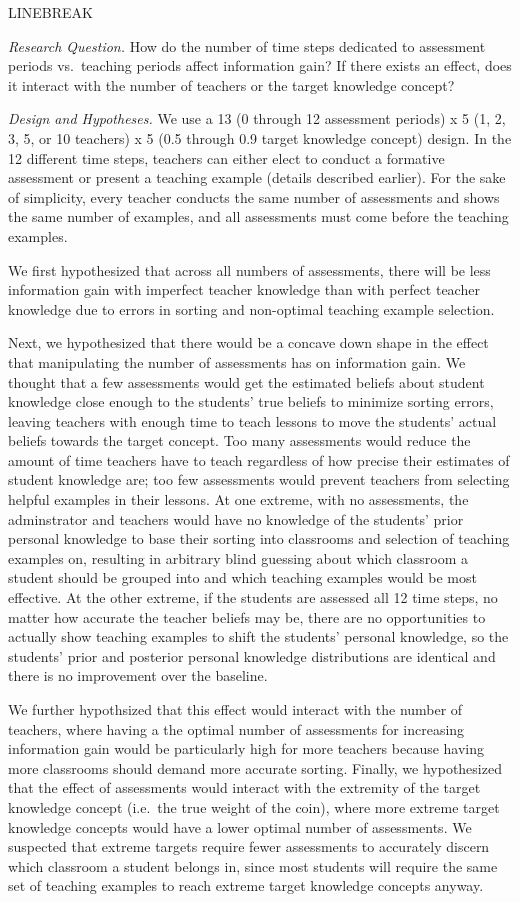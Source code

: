 \documentclass[10pt, letterpaper]{article}
\begin{document}
LINEBREAK

\emph{Research Question. } How do the number of time steps dedicated to
assessment periods vs.~teaching periods affect information gain? If
there exists an effect, does it interact with the number of teachers or
the target knowledge concept?

\emph{Design and Hypotheses. } We use a 13 (0 through 12 assessment
periods) x 5 (1, 2, 3, 5, or 10 teachers) x 5 (0.5 through 0.9 target
knowledge concept) design. In the 12 different time steps, teachers can
either elect to conduct a formative assessment or present a teaching
example (details described earlier). For the sake of simplicity, every
teacher conducts the same number of assessments and shows the same
number of examples, and all assessments must come before the teaching
examples.

We first hypothesized that across all numbers of assessments, there will
be less information gain with imperfect teacher knowledge than with
perfect teacher knowledge due to errors in sorting and non-optimal
teaching example selection.

Next, we hypothesized that there would be a concave down shape in the
effect that manipulating the number of assessments has on information
gain. We thought that a few assessments would get the estimated beliefs
about student knowledge close enough to the students' true beliefs to
minimize sorting errors, leaving teachers with enough time to teach
lessons to move the students' actual beliefs towards the target concept.
Too many assessments would reduce the amount of time teachers have to
teach regardless of how precise their estimates of student knowledge
are; too few assessments would prevent teachers from selecting helpful
examples in their lessons. At one extreme, with no assessments, the
adminstrator and teachers would have no knowledge of the students' prior
personal knowledge to base their sorting into classrooms and selection
of teaching examples on, resulting in arbitrary blind guessing about
which classroom a student should be grouped into and which teaching
examples would be most effective. At the other extreme, if the students
are assessed all 12 time steps, no matter how accurate the teacher
beliefs may be, there are no opportunities to actually show teaching
examples to shift the students' personal knowledge, so the students'
prior and posterior personal knowledge distributions are identical and
there is no improvement over the baseline.

We further hypothsized that this effect would interact with the number
of teachers, where having a the optimal number of assessments for
increasing information gain would be particularly high for more teachers
because having more classrooms should demand more accurate sorting.
Finally, we hypothesized that the effect of assessments would interact
with the extremity of the target knowledge concept (i.e.~the true weight
of the coin), where more extreme target knowledge concepts would have a
lower optimal number of assessments. We suspected that extreme targets
require fewer assessments to accurately discern which classroom a
student belongs in, since most students will require the same set of
teaching examples to reach extreme target knowledge concepts anyway.
\end{document}
